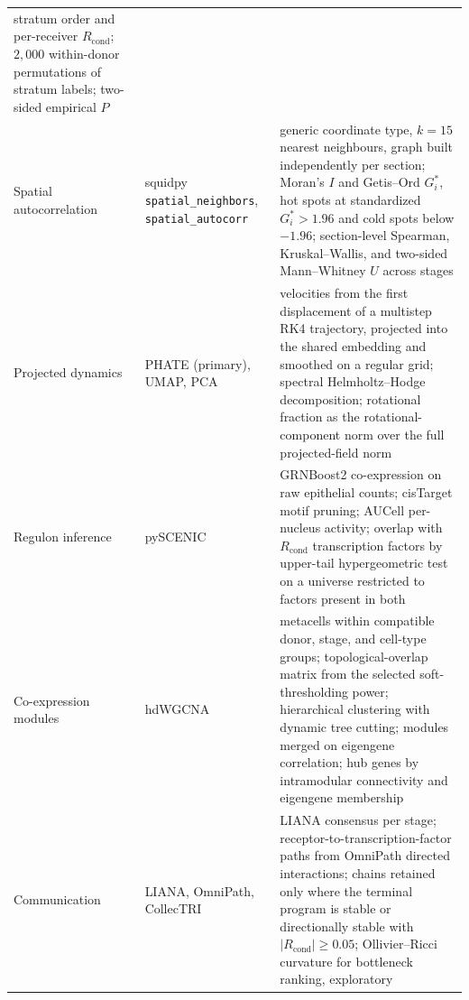 \begin{longtable}{@{}>{\raggedright\arraybackslash}p{}%
                    >{\raggedright\arraybackslash}p{}%
                    >{\raggedright\arraybackslash}p{}@{}}
  stratum order and per-receiver $R_{\mathrm{cond}}$; $2{,}000$ within-donor
  permutations of stratum labels; two-sided empirical $P$ \\
\addlinespace
Spatial autocorrelation & squidpy
  \texttt{spatial\_neighbors}, \texttt{spatial\_autocorr} & generic coordinate
  type, $k=15$ nearest neighbours, graph built independently per section;
  Moran's $I$ and Getis--Ord $G_i^{\ast}$, hot spots at standardized
  $G_i^{\ast}>1.96$ and cold spots below $-1.96$; section-level Spearman,
  Kruskal--Wallis, and two-sided Mann--Whitney $U$ across stages \\
\addlinespace
Projected dynamics & PHATE (primary), UMAP, PCA & velocities from the first
  displacement of a multistep RK4 trajectory, projected into the shared
  embedding and smoothed on a regular grid; spectral Helmholtz--Hodge
  decomposition; rotational fraction as the rotational-component norm over the
  full projected-field norm \\
\addlinespace
Regulon inference & pySCENIC & GRNBoost2 co-expression on raw epithelial
  counts; cisTarget motif pruning; AUCell per-nucleus activity; overlap with
  $R_{\mathrm{cond}}$ transcription factors by upper-tail hypergeometric test on
  a universe restricted to factors present in both \\
\addlinespace
Co-expression modules & hdWGCNA & metacells within compatible donor, stage, and
  cell-type groups; topological-overlap matrix from the selected
  soft-thresholding power; hierarchical clustering with dynamic tree cutting;
  modules merged on eigengene correlation; hub genes by intramodular
  connectivity and eigengene membership \\
\addlinespace
Communication & LIANA, OmniPath, CollecTRI & LIANA consensus per stage;
  receptor-to-transcription-factor paths from OmniPath directed interactions;
  chains retained only where the terminal program is stable or directionally
  stable with $|R_{\mathrm{cond}}|\geq0.05$; Ollivier--Ricci curvature for
  bottleneck ranking, exploratory \\
\end{longtable}